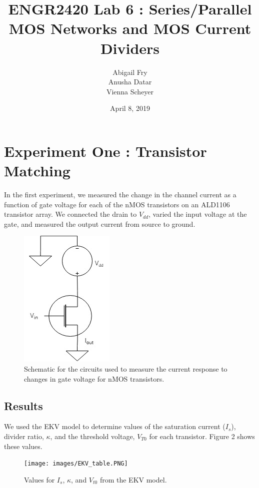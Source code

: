 \documentclass{article}
\title{ENGR2420 Lab 6 : Series/Parallel MOS Networks and MOS Current Dividers}
\author{Abigail Fry\\Anusha Datar\\ Vienna Scheyer}
\date{April 8, 2019}
\begin{document}
\maketitle

\section{Experiment One : Transistor Matching}
In the first experiment, we measured the change in the channel current as a function of gate voltage for each of the nMOS transistors on an ALD1106 transistor array. We connected the drain to $V_{dd}$, varied the input voltage at the gate, and measured the output current from source to ground. 
\begin{figure}[H]   
  \begin{center}       
  \includegraphics[scale = 0.5]{images/exp1_schematic.jpg}
  \caption{Schematic for the circuits used to measure the current response to changes in gate voltage for nMOS transistors.}   
  \label{fig:exp1_sch}
  \end{center}
\end{figure}

\subsection{Results}
We used the EKV model to determine values of the saturation current ($I_s$), divider ratio, $\kappa$, and the threshold voltage, $V_{T0}$ for each transistor. Figure 2 shows these values.

\begin{figure}[H]   
  \begin{center}      
  \texttt{[image: images/EKV\_table.PNG]}
  \caption{Values for $I_s$, $\kappa$, and $V_{t0}$ from the EKV model.}
  \end{center}
\end{figure}
\end{document}
